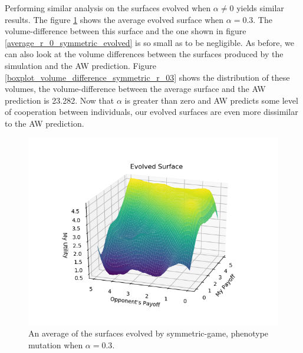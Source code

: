 \documentclass[11pt]{book}
\newcommand*{\np}{\par\noindent\newline}
\begin{document}
\np Performing similar analysis on the surfaces evolved when $\alpha \neq 0$ yields similar results.
The figure \ref{average_r_03_symmetric_evolved} shows the average evolved surface when $\alpha = 0.3$.
The volume-difference between this surface and the one shown in figure \ref{average_r_0_symmetric_evolved} is so small as to be negligible.
As before, we can also look at the volume differences between the surfaces produced by the simulation and the AW prediction.
Figure \ref{boxplot_volume_difference_symmetric_r_03} shows the distribution of these volumes, the volume-difference between the average surface and the AW prediction is 23.282.
Now that $\alpha$ is greater than zero and AW predicts some level of cooperation between individuals, our evolved surfaces are even more dissimilar to the AW prediction.

\begin{figure}
	\centering
	\includegraphics[scale=0.7]{resources/average_r_03_symmetric_evolved.png}
	\caption{An average of the surfaces evolved by symmetric-game, phenotype mutation when $\alpha = 0.3$.}
	\label{average_r_03_symmetric_evolved}
\end{figure}
\end{document}
